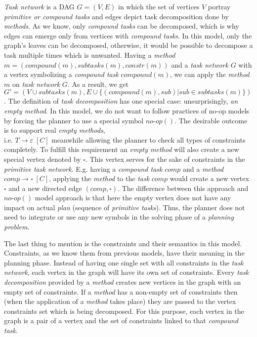 \medskip\noindent
\emph{Task network} is a DAG $G = (V, E)$ in which the set of vertices $V$ portray \emph{primitive or compound tasks} and edges depict task decomposition done by \emph{methods}. As we know, only \emph{compound tasks} can be decomposed, which is why edges can emerge only from vertices with \emph{compound tasks}. In this model, only the graph's leaves can be decomposed, otherwise, it would be possible to decompose a task multiple times which is unwanted. Having a \emph{method} $m = (compound(m), subtasks(m), constr(m))$ and a \emph{task network} $G$ with a vertex symbolizing a \emph{compound task} $compound(m)$, we can apply the \emph{method} $m$ on \emph{task network} $G$. As a result, we get $G' = (V \cup subtasks(m), E \cup \{(compound(m), sub) | sub \in subtasks(m)\})$. The definition of \emph{task decomposition} has one special case: unsurprisingly, \emph{an empty method}. In this model, we do not want to follow practices of no-op models by forcing the planner to use a special symbol $no\text{-}op()$. The desirable outcome is to support real \emph{empty methods}, \\ i.e. $T \rightarrow \varepsilon \; [C]$ meanwhile allowing the planner to check all types of constraints completely. To fulfill this requirement an \emph{empty method} will also create a new special vertex denoted by $\square$. This vertex serves for the sake of constraints in the \emph{primitive task network}. E.g. having a \emph{compound task} $comp$ and a \emph{method} $comp \rightarrow \square \; [C]$, applying the \emph{method} to the \emph{task} $comp$ would create a new vertex $\square$ and a new directed edge $(comp, \square)$. The difference between this approach and $no\text{-}op()$ model approach is that here the empty vertex does not have any impact on actual \emph{plan} (sequence of \emph{primitive tasks}). Thus, the planner does not need to integrate or use any new symbols in the solving phase of a \emph{planning problem}. 

\medskip\noindent
The last thing to mention is the constraints and their semantics in this model. Constraints, as we know them from previous models, have their meaning in the planning phase. Instead of having one single set with all constraints in the \emph{task network}, each vertex in the graph will have its own set of constraints. Every \emph{task decomposition} provided by a \emph{method} creates new vertices in the graph with an empty set of constraints. If a \emph{method} has a non-empty set of constraints then (when the application of a \emph{method} takes place) they are passed to the vertex constraints set which is being decomposed. For this purpose, each vertex in the graph is a pair of a vertex and the set of constraints linked to that \emph{compound task}.

